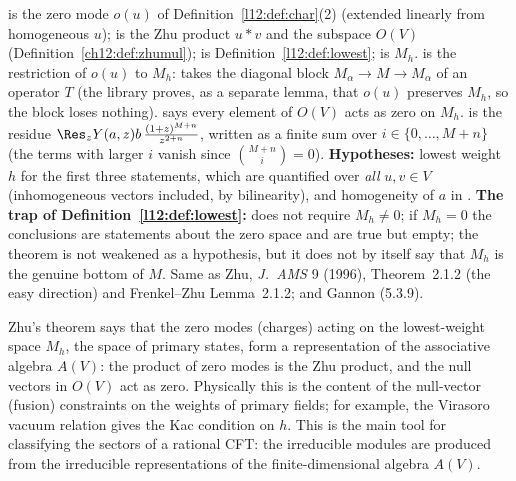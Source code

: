 \begin{dictionary}
 is the zero mode $o(u)$ of Definition~\ref{l12:def:char}(2) (extended linearly from homogeneous $u$);  is the
Zhu product $u*v$ and  the subspace $O(V)$ (Definition~\ref{ch12:def:zhumul});  is
Definition~\ref{l12:def:lowest};  is $M_h$.  is the restriction of $o(u)$ to $M_h$:
 takes the diagonal block $M_\alpha\to M\to M_\alpha$ of an operator $T$ (the library proves, as a separate lemma, that $o(u)$
preserves $M_h$, so the block loses nothing).  says every element of $O(V)$ acts as zero on $M_h$.
 is the residue $\Res_zY(a,z)b\,\frac{(1+z)^{M+n}}{z^{2+n}}$, written as a finite sum over $i\in\{0,\dots,M+n\}$
(the terms with larger $i$ vanish since $\binom{M+n}{i}=0$). \textbf{Hypotheses:} lowest weight $h$ for the first three statements, which
are quantified over \emph{all} $u,v\in V$ (inhomogeneous vectors included, by bilinearity), and homogeneity of $a$ in .
\textbf{The trap of Definition~\ref{l12:def:lowest}:}  does not require $M_h\neq0$; if $M_h=0$ the
conclusions are statements about the zero space and are true but empty; the theorem is not weakened as a hypothesis, but it
does not by itself say that $M_h$ is the genuine bottom of $M$. Same as Zhu, \emph{J.~AMS} 9 (1996), Theorem~2.1.2 (the easy direction) and
Frenkel--Zhu Lemma~2.1.2; and Gannon (5.3.9).
\end{dictionary}

\begin{physics}
Zhu's theorem says that the zero modes (charges) acting on the lowest-weight space $M_h$, the space of primary states, form a representation of the
associative algebra $A(V)$: the product of zero modes is the Zhu product, and the null vectors in $O(V)$ act as zero. Physically this is the content
of the null-vector (fusion) constraints on the weights of primary fields; for example, the Virasoro vacuum relation gives the Kac condition on $h$. This is
the main tool for classifying the sectors of a rational CFT: the irreducible modules are produced from the irreducible representations of the
finite-dimensional algebra $A(V)$.
\end{physics}

